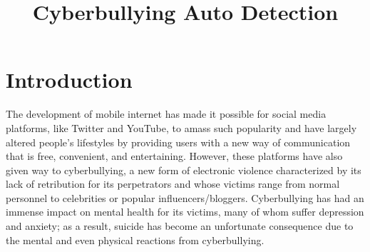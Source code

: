 \documentclass[conference]{IEEEtran}
\begin{document}
\title{Cyberbullying Auto Detection\\}

\author{
\and
{}
}


\section{Introduction}
The development of mobile internet has made it possible for social media platforms, like Twitter and YouTube, to amass such popularity and have largely altered people’s lifestyles by providing users with a new way of communication that is free, convenient, and entertaining. However, these platforms have also given way to cyberbullying, a new form of electronic violence characterized by its lack of retribution for its perpetrators and whose victims range from normal personnel to celebrities or popular influencers/bloggers. Cyberbullying has had an immense impact on mental health for its victims, many of whom suffer depression and anxiety; as a result, suicide has become an unfortunate consequence due to the mental and even physical reactions from cyberbullying.
\end{document}
